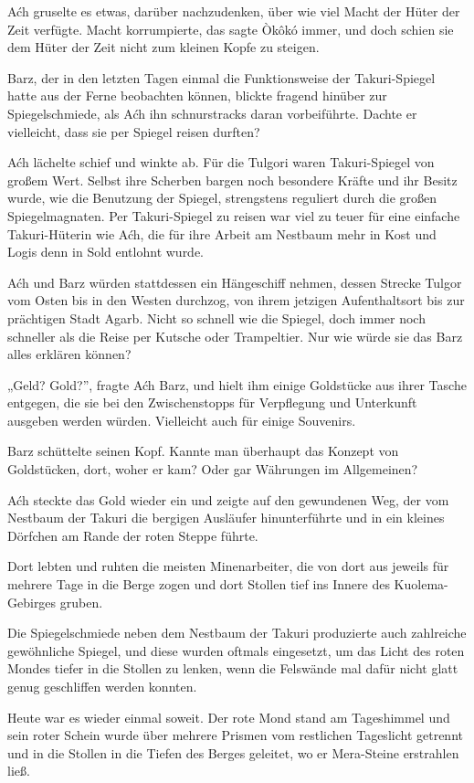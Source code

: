 Aćh gruselte es etwas, darüber nachzudenken, über wie viel Macht der Hüter der Zeit verfügte. Macht korrumpierte, das sagte Òkôkó immer, und doch schien sie dem Hüter der Zeit nicht zum kleinen Kopfe zu steigen.

Barz, der in den letzten Tagen einmal die Funktionsweise der Takuri-Spiegel hatte aus der Ferne beobachten können, blickte fragend hinüber zur Spiegelschmiede, als Aćh ihn schnurstracks daran vorbeiführte. Dachte er vielleicht, dass sie per Spiegel reisen durften?

Aćh lächelte schief und winkte ab. Für die Tulgori waren Takuri-Spiegel von großem Wert. Selbst ihre Scherben bargen noch besondere Kräfte und ihr Besitz wurde, wie die Benutzung der Spiegel, strengstens reguliert durch die großen Spiegelmagnaten. Per Takuri-Spiegel zu reisen war viel zu teuer für eine einfache Takuri-Hüterin wie Aćh, die für ihre Arbeit am Nestbaum mehr in Kost und Logis denn in Sold entlohnt wurde.

Aćh und Barz würden stattdessen ein Hängeschiff nehmen, dessen Strecke Tulgor vom Osten bis in den Westen durchzog, von ihrem jetzigen Aufenthaltsort bis zur prächtigen Stadt Agarb. Nicht so schnell wie die Spiegel, doch immer noch schneller als die Reise per Kutsche oder Trampeltier. Nur wie würde sie das Barz alles erklären können?

„Geld? Gold?”, fragte Aćh Barz, und hielt ihm einige Goldstücke aus ihrer Tasche entgegen, die sie bei den Zwischenstopps für Verpflegung und Unterkunft ausgeben werden würden. Vielleicht auch für einige Souvenirs.

Barz schüttelte seinen Kopf. Kannte man überhaupt das Konzept von Goldstücken, dort, woher er kam? Oder gar Währungen im Allgemeinen?

Aćh steckte das Gold wieder ein und zeigte auf den gewundenen Weg, der vom Nestbaum der Takuri die bergigen Ausläufer hinunterführte und in ein kleines Dörfchen am Rande der roten Steppe führte.

Dort lebten und ruhten die meisten Minenarbeiter, die von dort aus jeweils für mehrere Tage in die Berge zogen und dort Stollen tief ins Innere des Kuolema-Gebirges gruben.

Die Spiegelschmiede neben dem Nestbaum der Takuri produzierte auch zahlreiche gewöhnliche Spiegel, und diese wurden oftmals eingesetzt, um das Licht des roten Mondes tiefer in die Stollen zu lenken, wenn die Felswände mal dafür nicht glatt genug geschliffen werden konnten.

Heute war es wieder einmal soweit. Der rote Mond stand am Tageshimmel und sein roter Schein wurde über mehrere Prismen vom restlichen Tageslicht getrennt und in die Stollen in die Tiefen des Berges geleitet, wo er Mera-Steine erstrahlen ließ.

